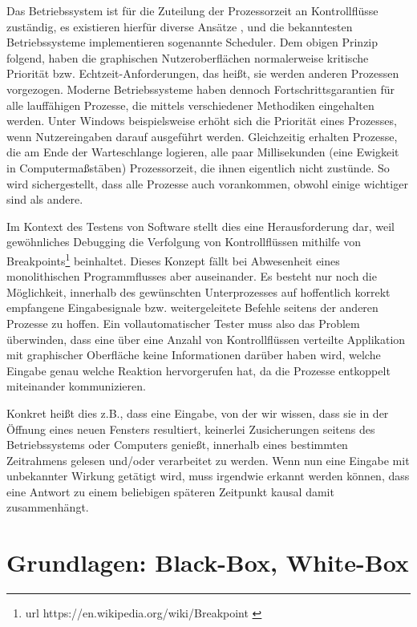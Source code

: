 Das Betriebssystem ist für die Zuteilung der Prozessorzeit an Kontrollflüsse
zuständig, es existieren hierfür diverse Ansätze \cite{ArpaciDusseau14-Book}, 
und die bekanntesten Betriebssysteme implementieren sogenannte \glqq{}Scheduler\grqq{}.
Dem obigen Prinzip folgend, haben die graphischen Nutzeroberflächen normalerweise
kritische Priorität bzw. \glqq{}Echtzeit\grqq{}-Anforderungen, das heißt, sie
werden anderen Prozessen vorgezogen. Moderne Betriebssysteme 
\cite{Stallings:2004:OS:993867} haben dennoch
Fortschrittsgarantien für alle lauffähigen Prozesse, die mittels verschiedener
Methodiken eingehalten werden. Unter Windows beispielsweise erhöht sich die
Priorität eines Prozesses, wenn Nutzereingaben darauf ausgeführt werden.
Gleichzeitig erhalten Prozesse, die am Ende der Warteschlange logieren,
alle paar Millisekunden (eine Ewigkeit in Computermaßstäben) Prozessorzeit,
die ihnen eigentlich nicht zustünde. So wird sichergestellt, dass alle Prozesse
auch vorankommen, obwohl einige wichtiger sind als andere.

Im Kontext des Testens von Software stellt dies eine Herausforderung dar,
weil gewöhnliches \glqq{}Debugging\grqq{} die Verfolgung von Kontrollflüssen
mithilfe von Breakpoints\footnote{ url{ https://en.wikipedia.org/wiki/Breakpoint } }
beinhaltet. Dieses Konzept fällt bei Abwesenheit eines monolithischen Programmflusses
aber auseinander. Es besteht nur noch die Möglichkeit, innerhalb des gewünschten
Unterprozesses auf hoffentlich korrekt empfangene Eingabesignale bzw. weitergeleitete
Befehle seitens der anderen Prozesse zu hoffen. Ein vollautomatischer Tester
muss also das Problem überwinden, dass eine über eine Anzahl von Kontrollflüssen
verteilte Applikation mit graphischer Oberfläche keine Informationen darüber
haben wird, welche Eingabe genau welche Reaktion hervorgerufen hat, da
die Prozesse entkoppelt miteinander kommunizieren.

Konkret heißt dies z.B., dass eine Eingabe, von der wir wissen, dass sie in der 
Öffnung eines neuen Fensters resultiert, keinerlei Zusicherungen seitens des 
Betriebssystems oder Computers genießt, innerhalb eines bestimmten Zeitrahmens 
gelesen und/oder verarbeitet zu werden. Wenn nun eine Eingabe mit unbekannter Wirkung 
getätigt wird, muss irgendwie erkannt werden können, dass eine Antwort zu einem 
beliebigen späteren Zeitpunkt kausal damit zusammenhängt.


\section{Grundlagen: Black-Box, White-Box}


